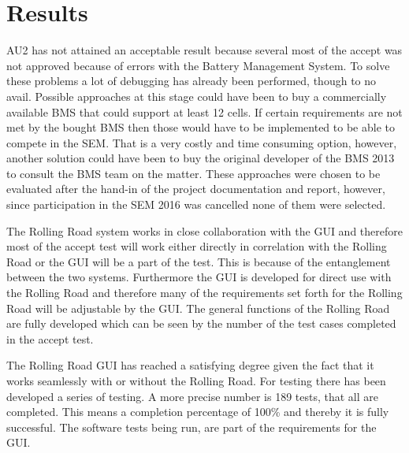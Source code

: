 \chapter{Results}
AU2 has not attained an acceptable result because several most of the accept was not approved because of errors with the Battery Management System. To solve these problems a lot of debugging has already been performed, though to no avail. Possible approaches at this stage could have been to buy a commercially available  BMS that could support at least 12 cells. If certain requirements are not met by the bought BMS then those would have to be implemented to be able to compete in the SEM. That is a very costly and time consuming option, however, another solution could have been to buy the original developer of the BMS 2013 to consult the BMS team on the matter. These approaches were chosen to be evaluated after the hand-in of the project documentation and report, however, since participation in the SEM 2016 was cancelled none of them were selected. 

The Rolling Road system works in close collaboration with the GUI and therefore most of the accept test will work either directly in correlation with the Rolling Road or the GUI will be a part of the test. This is because of the entanglement between the two systems. Furthermore the GUI is developed for direct use with the Rolling Road and therefore many of the requirements set forth for the Rolling Road will be adjustable by the GUI. The general functions of the Rolling Road are fully developed which can be seen by the number of the test cases completed in the accept test.   

The Rolling Road GUI has reached a satisfying degree given the fact that it works seamlessly with or without the Rolling Road. For testing there has been developed a series of testing. A more precise number is 189 tests, that all are completed. This means a completion percentage of 100\% and thereby it is fully successful. The software tests being run, are part of the requirements for the GUI. 

